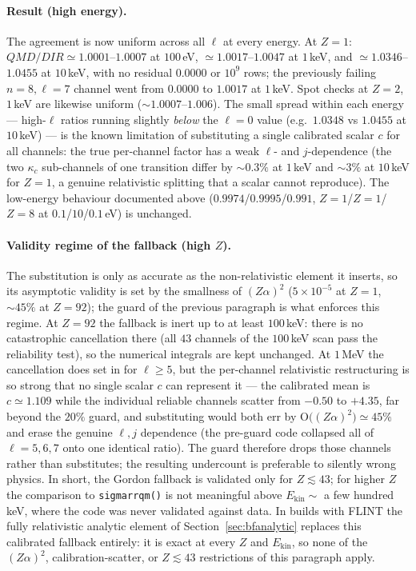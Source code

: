 \documentclass[11pt,a4paper]{article}
\begin{document}
\paragraph{Result (high energy).} The agreement is now uniform across
all $\ell$ at every energy.  At $Z=1$: $QMD/DIR\simeq1.0001$--$1.0007$
at $100$\,eV, $\simeq1.0017$--$1.0047$ at $1$\,keV, and
$\simeq1.0346$--$1.0455$ at $10$\,keV, with no residual $0.0000$ or
$10^{9}$ rows; the previously failing $n=8,\ell=7$ channel went from
$0.0000$ to $1.0017$ at $1$\,keV.  Spot checks at $Z=2$, $1$\,keV are
likewise uniform ($\sim1.0007$--$1.006$).  The small spread within each
energy --- high-$\ell$ ratios running slightly \emph{below} the
$\ell=0$ value (e.g.\ $1.0348$ vs $1.0455$ at $10$\,keV) --- is the
known limitation of substituting a single calibrated scalar $c$ for all
channels: the true per-channel factor has a weak $\ell$- and
$j$-dependence (the two $\kappa_{c}$ sub-channels of one transition
differ by $\sim0.3\%$ at $1$\,keV and $\sim3\%$ at $10$\,keV for $Z=1$,
a genuine relativistic splitting that a scalar cannot reproduce).  The
low-energy behaviour documented above ($0.9974$/$0.9995$/$0.991$,
  $Z=1$/$Z=1$/$Z=8$ at $0.1$/$10$/$0.1$\,eV) is unchanged.

\paragraph{Validity regime of the fallback (high $Z$).} The substitution
is only as accurate as the non-relativistic element it inserts, so its
asymptotic validity is set by the smallness of $(Z\alpha)^{2}$ ($5\times
10^{-5}$ at $Z=1$, $\sim45\%$ at $Z=92$); the guard of the previous
paragraph is what enforces this regime.  At $Z=92$ the fallback is inert
up to at least $100$\,keV: there is no catastrophic cancellation there
(all $43$ channels of the $100$\,keV scan pass the reliability test), so
the numerical integrals are kept unchanged.  At $1$\,MeV the
cancellation does set in for $\ell\ge5$, but the per-channel
relativistic restructuring is so strong that no single scalar $c$ can
represent it --- the calibrated mean is $c\simeq1.109$ while the
individual reliable channels scatter from $-0.50$ to $+4.35$, far beyond
the $20\%$ guard, and substituting would both err by
$\mathrm{O}\bigl((Z\alpha)^{2}\bigr)\simeq45\%$ and erase the genuine
$\ell,j$ dependence (the pre-guard code collapsed all of $\ell=5,6,7$
onto one identical ratio).  The guard therefore drops those channels
rather than substitutes; the resulting undercount is preferable to
silently wrong physics.  In short, the Gordon fallback is validated only
for $Z\lesssim43$; for higher $Z$ the comparison to {\tt sigmarrqm()}
is not meaningful above $E_{\mathrm{kin}}\sim$ a few hundred keV, where
the code was never validated against data.  In builds with FLINT the
fully relativistic analytic element of
Section~\ref{sec:bfanalytic} replaces this calibrated fallback
entirely: it is exact at every $Z$ and $E_{\mathrm{kin}}$, so none of
the $(Z\alpha)^{2}$, calibration-scatter, or $Z\lesssim43$ restrictions
of this paragraph apply.
\end{document}
